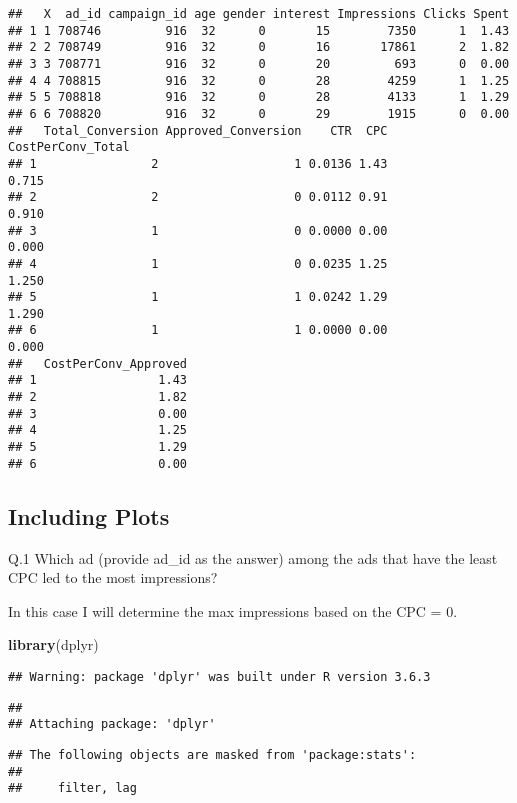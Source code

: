 \documentclass[
]{article}
\newenvironment{Shaded}{\begin{snugshade}}{\end{snugshade}}
\newcommand{\KeywordTok}[1]{\textcolor[rgb]{0.13,0.29,0.53}{\textbf{#1}}}
\newcommand{\NormalTok}[1]{#1}
\begin{document}
\begin{verbatim}
##   X  ad_id campaign_id age gender interest Impressions Clicks Spent
## 1 1 708746         916  32      0       15        7350      1  1.43
## 2 2 708749         916  32      0       16       17861      2  1.82
## 3 3 708771         916  32      0       20         693      0  0.00
## 4 4 708815         916  32      0       28        4259      1  1.25
## 5 5 708818         916  32      0       28        4133      1  1.29
## 6 6 708820         916  32      0       29        1915      0  0.00
##   Total_Conversion Approved_Conversion    CTR  CPC CostPerConv_Total
## 1                2                   1 0.0136 1.43             0.715
## 2                2                   0 0.0112 0.91             0.910
## 3                1                   0 0.0000 0.00             0.000
## 4                1                   0 0.0235 1.25             1.250
## 5                1                   1 0.0242 1.29             1.290
## 6                1                   1 0.0000 0.00             0.000
##   CostPerConv_Approved
## 1                 1.43
## 2                 1.82
## 3                 0.00
## 4                 1.25
## 5                 1.29
## 6                 0.00
\end{verbatim}

\hypertarget{including-plots}{%
\subsection{Including Plots}\label{including-plots}}

Q.1 Which ad (provide ad\_id as the answer) among the ads that have the
least CPC led to the most impressions?

In this case I will determine the max impressions based on the CPC = 0.

\begin{Shaded}
\begin{Highlighting}[]
\KeywordTok{library}\NormalTok{(dplyr)}
\end{Highlighting}
\end{Shaded}

\begin{verbatim}
## Warning: package 'dplyr' was built under R version 3.6.3
\end{verbatim}

\begin{verbatim}
## 
## Attaching package: 'dplyr'
\end{verbatim}

\begin{verbatim}
## The following objects are masked from 'package:stats':
## 
##     filter, lag
\end{verbatim}
\end{document}
